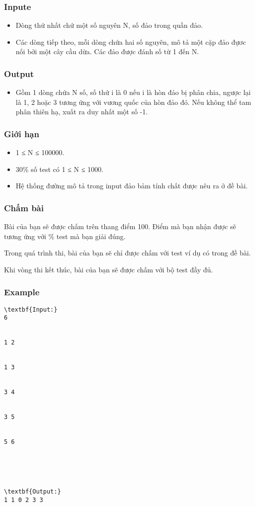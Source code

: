 \subsubsection{   Inpute  }
\begin{itemize}
	\item     Dòng thứ nhất chứ một số nguyên N, số đảo trong quần đảo.   
	\item     Các dòng tiếp theo, mỗi dòng chứa hai số nguyên, mô tả một cặp đảo đựơc nối bởi một cây cầu dừa. Các đảo được đánh số từ 1 đến N.   
\end{itemize}

\subsubsection{   Output  }
\begin{itemize}
	\item     Gồm 1 dòng chứa N số, số thứ i là 0 nếu i là hòn đảo bị phân chia, ngược lại là 1, 2 hoặc 3 tương ứng với vương quốc của hòn đảo đó. Nếu không thể tam phân thiên hạ, xuất ra duy nhất một số -1.   
\end{itemize}

\subsubsection{   Giới hạn  }
\begin{itemize}
	\item     1 ≤ N ≤ 100000.   
	\item     30\% số test có 1 ≤ N ≤ 1000.   
	\item     Hệ thống đường mô tả trong input đảo bảm tính chất được nêu ra ở đề bài.   
\end{itemize}

\subsubsection{   Chấm bài  }

   Bài của bạn sẽ được chấm trên thang điểm 100. Điểm mà bạn nhận được sẽ tương ứng với \% test mà bạn giải đúng.  

   Trong quá trình thi, bài của bạn sẽ chỉ được chấm với test ví dụ có trong đề bài.  

   Khi vòng thi kết thúc, bài của bạn sẽ được chấm với bộ test đầy đủ.  

\subsubsection{   Example  }
\begin{verbatim}
\textbf{Input:}
6


1 2


1 3


3 4


3 5


5 6





\textbf{Output:}
1 1 0 2 3 3
\end{verbatim}
